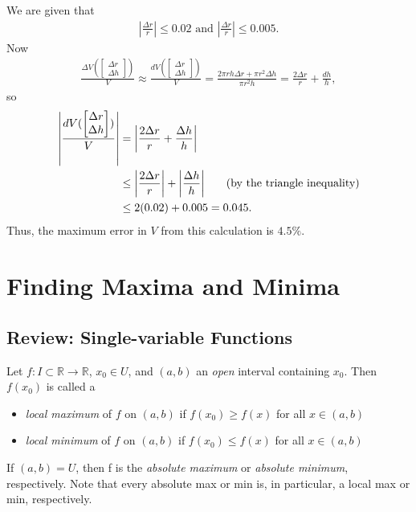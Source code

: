 \documentclass[12pt,letterpaper,reqno]{article}
\numberwithin{equation}{section}
\begin{document}
{\begin{example}
	We are given that
	\begin{align*}
		|\frac{\Delta r}{r}|\leq 0.02 \text{ and } |\frac{\Delta r}{r}|\leq 0.005.
	\end{align*}
	Now
	\begin{align*}
		\frac{\Delta V(\begin{bmatrix} \Delta r \\ \Delta h \end{bmatrix})}{V} \approx \frac{dV(\begin{bmatrix} \Delta r \\ \Delta h \end{bmatrix})}{V}=\frac{2\pi r h \Delta r+\pi r^2 \Delta h}{\pi r^2 h}=\frac{2 \Delta r}{r}+\frac{dh}{h},
	\end{align*}
	so
	\begin{align*}
		\left|\frac{dV(\begin{bmatrix} \Delta r \\ \Delta h \end{bmatrix})}{V}\right|&=\left|\frac{2 \Delta r}{r}+\frac{\Delta h}{h}\right| \\
		&\leq \left|\frac{2 \Delta r}{r}\right|+\left|\frac{\Delta h}{h}\right| \hspace{0.5cm} \text{ (by the triangle inequality)}\\
		&\leq 2(0.02)+0.005=0.045.
	\end{align*}
	Thus, the maximum error in $V$ from this calculation is $4.5\%$.
\end{example}



\section{Finding Maxima and Minima}
\subsection{Review: Single-variable Functions}
Let $f:I \subset \mathbb{R} \to \mathbb{R}$, $x_0 \in U$, and $(a,b)$ an \emph{open} interval containing $x_0$. Then $f(x_0)$ is called a 
\begin{itemize}
	\item \emph{local maximum} of $f$ on $(a,b)$ if $f(x_0) \geq f(x)$ for all $x \in (a,b)$
	\item \emph{local minimum} of $f$ on $(a,b)$ if $f(x_0) \leq f(x)$ for all $x \in (a,b)$
\end{itemize}
If $(a,b)=U$, then f is the \emph{absolute maximum} or \emph{absolute minimum}, respectively. Note that every absolute max or min is, in particular, a local max or min, respectively.

}
\end{document}
